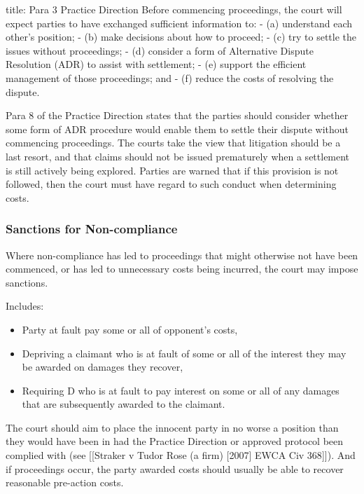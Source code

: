 \documentclass[
]{article}
\newenvironment{Shaded}{}{}
\newcommand{\NormalTok}[1]{#1}
\providecommand{\tightlist}{%
  \setlength{\itemsep}{0pt}\setlength{\parskip}{0pt}}
\begin{document}
\begin{Shaded}
\begin{Highlighting}[]
\NormalTok{title: Para 3 Practice Direction}
\NormalTok{Before commencing proceedings, the court will expect parties to have exchanged sufficient information to:}
\NormalTok{{-} (a) understand each other’s position;}
\NormalTok{{-} (b) make decisions about how to proceed;}
\NormalTok{{-} (c) try to settle the issues without proceedings;}
\NormalTok{{-} (d) consider a form of Alternative Dispute Resolution (ADR) to assist with settlement;}
\NormalTok{{-} (e) support the efficient management of those proceedings; and}
\NormalTok{{-} (f) reduce the costs of resolving the dispute.}
\end{Highlighting}
\end{Shaded}

Para 8 of the Practice Direction states that the parties should consider
whether some form of ADR procedure would enable them to settle their
dispute without commencing proceedings. The courts take the view that
litigation should be a last resort, and that claims should not be issued
prematurely when a settlement is still actively being explored. Parties
are warned that if this provision is not followed, then the court must
have regard to such conduct when determining costs.

\hypertarget{sanctions-for-non-compliance}{%
\subsubsection{Sanctions for
Non-compliance}\label{sanctions-for-non-compliance}}

Where non-compliance has led to proceedings that might otherwise not
have been commenced, or has led to unnecessary costs being incurred, the
court may impose sanctions.

Includes:

\begin{itemize}
\tightlist
\item
  Party at fault pay some or all of opponent's costs,
\item
  Depriving a claimant who is at fault of some or all of the interest
  they may be awarded on damages they recover,
\item
  Requiring D who is at fault to pay interest on some or all of any
  damages that are subsequently awarded to the claimant.
\end{itemize}

The court should aim to place the innocent party in no worse a position
than they would have been in had the Practice Direction or approved
protocol been complied with (see {[}{[}Straker v Tudor Rose (a firm)
{[}2007{]} EWCA Civ 368{]}{]}). And if proceedings occur, the party
awarded costs should usually be able to recover reasonable pre-action
costs.
\end{document}
